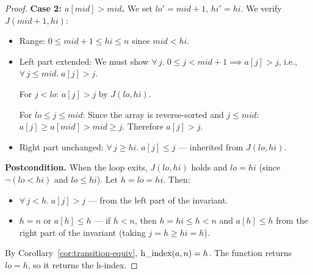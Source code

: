 \begin{proof}
\medskip
\textbf{Case 2: $a[\mathit{mid}] > \mathit{mid}$.}
We set $\mathit{lo}' = \mathit{mid} + 1$, $\mathit{hi}' = \mathit{hi}$.
We verify $J(\mathit{mid} + 1, \mathit{hi})$:
\begin{itemize}
  \item Range: $0 \leq \mathit{mid} + 1 \leq \mathit{hi} \leq n$ since
    $\mathit{mid} < \mathit{hi}$.
  \item Left part extended: We must show
    $\forall\, j.\; 0 \leq j < \mathit{mid} + 1 \implies a[j] > j$,
    i.e., $\forall\, j \leq \mathit{mid}.\; a[j] > j$.

    For $j < \mathit{lo}$: $a[j] > j$ by $J(\mathit{lo}, \mathit{hi})$.

    For $\mathit{lo} \leq j \leq \mathit{mid}$:
    Since the array is reverse-sorted and $j \leq \mathit{mid}$:
    $a[j] \geq a[\mathit{mid}] > \mathit{mid} \geq j$.
    Therefore $a[j] > j$.
  \item Right part unchanged: $\forall\, j \geq \mathit{hi}.\; a[j] \leq j$ ---
    inherited from $J(\mathit{lo}, \mathit{hi})$.
\end{itemize}

\medskip\noindent
\textbf{Postcondition.}
When the loop exits, $J(\mathit{lo}, \mathit{hi})$ holds and $\mathit{lo} = \mathit{hi}$
(since $\neg(\mathit{lo} < \mathit{hi})$ and $\mathit{lo} \leq \mathit{hi}$).
Let $h = \mathit{lo} = \mathit{hi}$. Then:
\begin{itemize}
  \item $\forall\, j < h.\; a[j] > j$ --- from the left part of the invariant.
  \item $h = n$ or $a[h] \leq h$ --- if $h < n$, then $h = \mathit{hi} \leq h < n$
    and $a[h] \leq h$ from the right part of the invariant (taking $j = h \geq \mathit{hi} = h$).
\end{itemize}
By Corollary~\ref{cor:transition-equiv}, $\operatorname{h\_index}(a, n) = h$.
The function returns $\mathit{lo} = h$, so it returns the h-index.
\end{proof}
